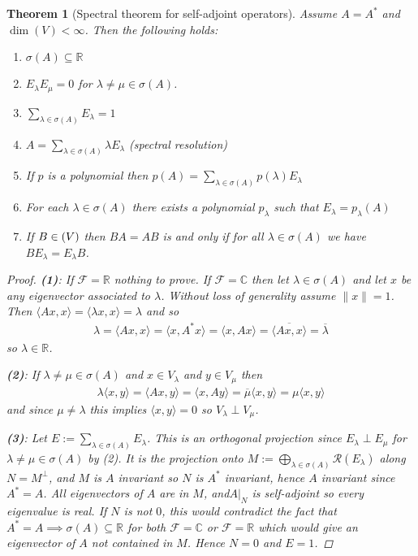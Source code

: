 \documentclass[10pt,twoside,openany,final]{memoir}
\theoremstyle{break}
\newtheorem{theorem}[section]{Theorem}
\theoremstyle{Break}
\newcommand{\lv}{\lVert}
\newcommand{\rv}{\rVert}
\let\End\relax
\DeclareMathOperator{\End}{End}
\newcommand{\R}{\mathbb{R}}
\newcommand{\C}{\mathbb{C}}
\newcommand{\F}{\mathcal{F}}
\newcommand{\Rg}{\mathcal{R}}
\begin{document}
\begin{theorem}[Spectral theorem for self-adjoint operators]
	Assume $A=A^*$ and $\dim(V) < \infty$. Then the following holds:
	\begin{enumerate}
		\item $\sigma(A) \subseteq \R$
		\item $E_\lambda E_\mu=0$ for $\lambda \neq \mu \in \sigma(A)$.
		\item $ \sum_{\lambda \in \sigma(A)}E_\lambda=1 $
		\item $A= \sum_{\lambda \in \sigma(A)} \lambda E_\lambda$ (spectral resolution)
		\item If $p$ is a polynomial then $p(A)=\sum_{\lambda \in \sigma(A)}p(\lambda) E_\lambda$
		\item For each $\lambda \in \sigma(A)$ there exists a polynomial $p_\lambda$ such that $E_\lambda= p_\lambda(A)$
		\item If $B \in \End(V)$ then $BA=AB$ is and only if for all $\lambda \in \sigma(A)$ we have $B E_\lambda = E_\lambda B$.
	\end{enumerate}
	\begin{proof}
		\textbf{(1)}: If $\F=\R$ nothing to prove. If $\F=\C$ then let $\lambda \in \sigma(A)$ and let $x$ be any eigenvector associated to $\lambda$. Without loss of generality assume $\lv x \rv=1$. Then $\langle Ax,x\rangle=\langle \lambda x ,x \rangle = \lambda$ and so
		\begin{align*}
			\lambda=\langle Ax ,x \rangle = \langle x,A^*x \rangle = \langle x,Ax \rangle = \overline{\langle Ax,x\rangle}= \overline{\lambda}
		\end{align*}
		so $\lambda \in \R$.

		\noindent\textbf{(2)}: If $\lambda \neq \mu \in \sigma(A)$ and $x \in V_\lambda$ and $y \in V_\mu$ then
		\begin{align*}
			\lambda \langle x,y \rangle = \langle Ax,y\rangle = \langle x,Ay \rangle = \overline{\mu} \langle x,y \rangle = \mu \langle x, y \rangle
		\end{align*}
		and since $\mu \neq \lambda$ this implies $\langle x,y \rangle = 0$ so $V_\lambda \perp V_\mu$.

		\noindent\textbf{(3)}: Let $E:=\sum_{\lambda \in \sigma(A)} E_\lambda$. This is an orthogonal projection since $E_\lambda \perp E_\mu$ for $\lambda \neq \mu \in \sigma(A)$ by (2). It is the projection onto $M:= \bigoplus_{\lambda \in \sigma(A)} \Rg(E_\lambda)$ along $N=M^\perp$, and $M$ is $A$ invariant so $N$ is $A^*$ invariant, hence $A$ invariant since $A^*=A$. All eigenvectors of $A$ are in $M$, and$A\big|_N$ is self-adjoint so every eigenvalue is real. If $N$ is not $0$, this would contradict the fact that $A^*=A \implies \sigma(A) \subseteq \R$ for both $\F=\C$ or $\F=\R$ which would give an eigenvector of $A$ not contained in $M$. Hence $N=0$ and $E=1$.


\end{proof}
\end{theorem}
\end{document}
